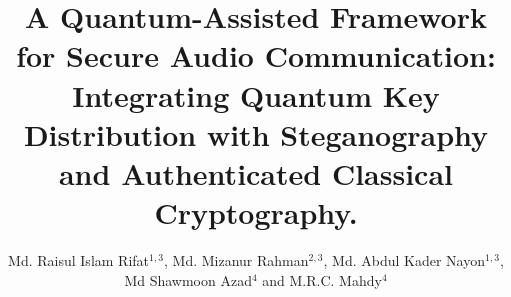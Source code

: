 \documentclass[12pt]{article}
\begin{document}
\title[A Quantum-Assisted Framework for Secure Audio Communication]{A Quantum-Assisted Framework for Secure Audio Communication: Integrating Quantum Key Distribution with Steganography and Authenticated Classical Cryptography.}
\author{Md. Raisul Islam Rifat$^{1,3}$, Md. Mizanur Rahman$^{2,3}$, Md. Abdul Kader Nayon$^{1,3}$, Md Shawmoon Azad$^{4}$ and M.R.C. Mahdy$^{4}$}
\end{document}

